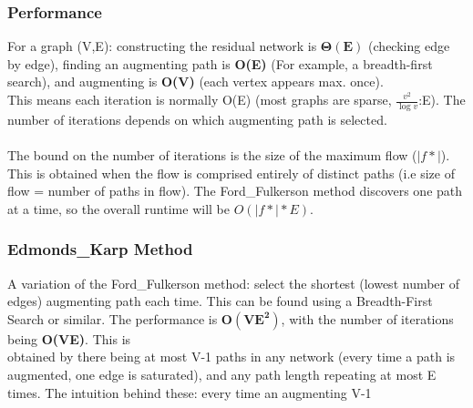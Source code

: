 \subsubsection{Performance}
For a graph (V,E): constructing the residual network is $\boldsymbol{\Theta(E)}$ (checking edge by edge), finding an augmenting path is \textbf{O(E)} (For example, a breadth-first search), and augmenting is \textbf{O(V)} (each vertex appears max. once). \\
This means each iteration is normally O(E) (most graphs are sparse, $\frac{v^2}{\log v}$:E). The number of iterations depends on which augmenting path is selected.\\ \\
The bound on the number of iterations is the size of the maximum flow ($|f*|$). This is obtained when the flow is comprised entirely of distinct paths (i.e size of flow = number of paths in flow). The Ford\_Fulkerson method discovers one path at a time, so the overall runtime will be $O(|f*|*E)$.

\subsubsection{Edmonds\_Karp Method}
A variation of the Ford\_Fulkerson method: select the shortest (lowest number of edges) augmenting path each time. This can be found using a Breadth-First Search or similar. The performance is $\boldsymbol{O(VE^2)}$, with the number of iterations being \textbf{O(VE)}. This is \\obtained by there being at most V-1 paths in any network (every time a path is augmented, one edge is saturated), and any path length repeating at most E times. The intuition behind these: every time an augmenting V-1
